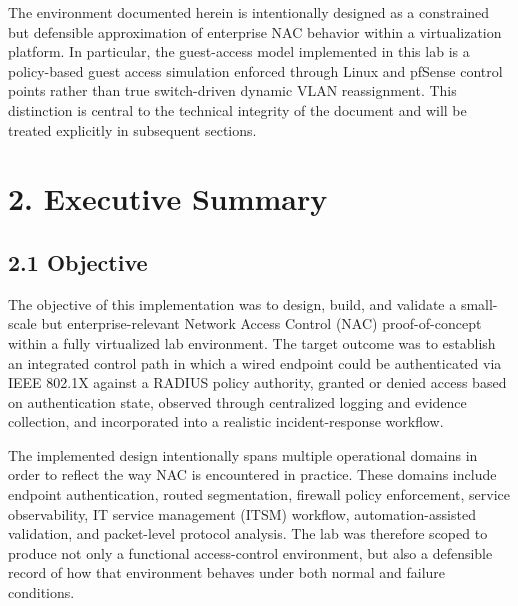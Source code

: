\documentclass[11pt]{article}
\begin{document}
The environment documented herein is intentionally designed as a constrained but defensible approximation of enterprise NAC behavior within a virtualization platform. In particular, the guest-access model implemented in this lab is a policy-based guest access simulation enforced through Linux and pfSense control points rather than true switch-driven dynamic VLAN reassignment. This distinction is central to the technical integrity of the document and will be treated explicitly in subsequent sections.


\section{2. Executive Summary}
\label{sec:executive-summary}


\subsection{2.1 Objective}
\label{sec:objective}

The objective of this implementation was to design, build, and validate a small-scale but enterprise-relevant Network Access Control (NAC) proof-of-concept within a fully virtualized lab environment. The target outcome was to establish an integrated control path in which a wired endpoint could be authenticated via IEEE 802.1X against a RADIUS policy authority, granted or denied access based on authentication state, observed through centralized logging and evidence collection, and incorporated into a realistic incident-response workflow.

The implemented design intentionally spans multiple operational domains in order to reflect the way NAC is encountered in practice. These domains include endpoint authentication, routed segmentation, firewall policy enforcement, service observability, IT service management (ITSM) workflow, automation-assisted validation, and packet-level protocol analysis. The lab was therefore scoped to produce not only a functional access-control environment, but also a defensible record of how that environment behaves under both normal and failure conditions.
\end{document}
